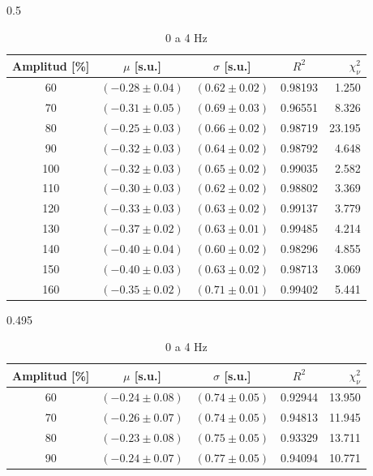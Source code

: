 \begin{landscape}
\begin{table} %
\centering




\begin{subtable}{0.5\linewidth}
\centering
\caption{0 a 3 Hz} %
{\small
\renewcommand{\arraystretch}{0.95285}
\begin{tabular}{c c c c r} %
\toprule
Amplitud [\%] & $\mu$ [s.u.] & $\sigma$ [s.u.] & $R^2$ & $\chi_\nu^2$\\
\midrule
60 & $(-0.28\pm0.04)$  & $(0.62\pm0.02)$  & 0.98193 & 1.250\\
70 & $(-0.31\pm0.05)$  & $(0.69\pm0.03)$  & 0.96551 & 8.326\\
80 & $(-0.25\pm0.03)$  & $(0.66\pm0.02)$  & 0.98719 & 23.195\\
90 & $(-0.32\pm0.03)$  & $(0.64\pm0.02)$  & 0.98792 & 4.648\\
100 & $(-0.32\pm0.03)$  & $(0.65\pm0.02)$  & 0.99035 & 2.582\\
110 & $(-0.30\pm0.03)$  & $(0.62\pm0.02)$  & 0.98802 & 3.369\\
120 & $(-0.33\pm0.03)$  & $(0.63\pm0.02)$  & 0.99137 & 3.779\\
130 & $(-0.37\pm0.02)$  & $(0.63\pm0.01)$  & 0.99485 & 4.214\\
140 & $(-0.40\pm0.04)$  & $(0.60\pm0.02)$  & 0.98296 & 4.855\\
150 & $(-0.40\pm0.03)$  & $(0.63\pm0.02)$  & 0.98713 & 3.069\\
160 & $(-0.35\pm0.02)$  & $(0.71\pm0.01)$  & 0.99402 & 5.441\\
\bottomrule
\end{tabular}} 
\end{subtable}
\begin{subtable}{0.495\linewidth} 
\centering
\caption{0 a 4 Hz} %
{\small %
\renewcommand{\arraystretch}{0.95285}
\begin{tabular}{c c c c r}
\toprule
Amplitud [\%] & $\mu$ [s.u.] & $\sigma$ [s.u.]  & $R^2$ &   $\chi_\nu^2$\\ %
\midrule
60 & $(-0.24\pm0.08)$  & $(0.74\pm0.05)$  & 0.92944 & 13.950\\
70 & $(-0.26\pm0.07)$  & $(0.74\pm0.05)$  & 0.94813 & 11.945\\
80 & $(-0.23\pm0.08)$  & $(0.75\pm0.05)$  & 0.93329 & 13.711\\
90 & $(-0.24\pm0.07)$  & $(0.77\pm0.05)$  & 0.94094 & 10.771\\

\end{tabular}}
\end{subtable}
\end{table}
\end{landscape}
